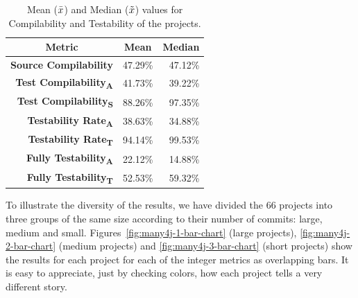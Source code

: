 \begin{table}[h]
    \centering
    \caption{Mean ($\bar{x}$) and Median ($\tilde{x}$) values for Compilability and Testability of the projects.}
        \label{table:results-3}
        \begin{tabular}{|r|r|r|}
            \hline
            \multicolumn{1}{|c|}{\textbf{Metric}} & \multicolumn{1}{c|}{\textbf{Mean}} & \multicolumn{1}{c|}{\textbf{Median}} \\ \hline
            \textbf{Source Compilability}                         & 47.29\%                              & 47.12\%                                \\ \hline
            \textbf{Test Compilability\textsubscript{A}}          & 41.73\%                              & 39.22\%                                \\ \hline
            \textbf{Test Compilability\textsubscript{S}}          & 88.26\%                              & 97.35\%                                \\ \hline
            \textbf{Testability Rate\textsubscript{A}}           & 38.63\%                              & 34.88\%                                \\ \hline
            \textbf{Testability Rate\textsubscript{T}}           & 94.14\%                              & 99.53\%                                \\ \hline
            \textbf{Fully Testability\textsubscript{A}}          & 22.12\%                              & 14.88\%                                \\ \hline
            \textbf{Fully Testability\textsubscript{T}}          & 52.53\%                              & 59.32\%                                \\ \hline
    \end{tabular}
\end{table}


To illustrate the diversity of the results, we have divided the 66 projects into three groups of the same size according to their number of commits: large, medium and small. 
Figures~\ref{fig:many4j-1-bar-chart} (large projects), \ref{fig:many4j-2-bar-chart} (medium projects) and \ref{fig:many4j-3-bar-chart} (short projects) show the results for each project for each of the integer metrics as overlapping bars.
It is easy to appreciate, just by checking colors, how each project tells a very different story. 

